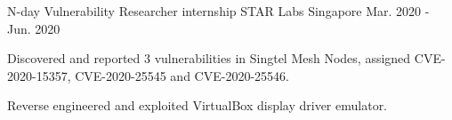 \begin{cventries}
  \cventry
    {N-day Vulnerability Researcher internship} %
    {STAR Labs} %
    {Singapore} %
    {Mar. 2020 - Jun. 2020} %
    {
      \begin{cvitems} %
        \item {Discovered and reported 3 vulnerabilities in Singtel Mesh Nodes, assigned CVE-2020-15357, CVE-2020-25545 and CVE-2020-25546.}
        \item {Reverse engineered and exploited VirtualBox display driver emulator.}
      \end{cvitems}
    }


\end{cventries}
